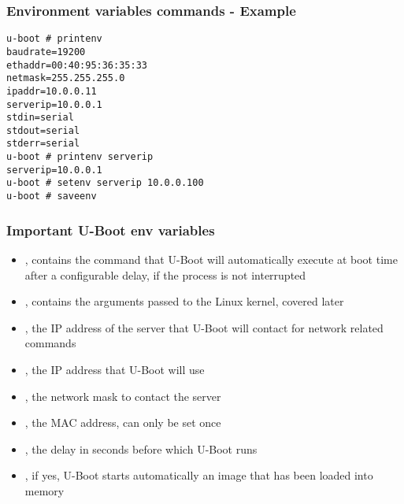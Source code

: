 \begin{frame}[fragile]
\frametitle{Environment variables commands - Example}
\begin{verbatim}
u-boot # printenv
baudrate=19200
ethaddr=00:40:95:36:35:33
netmask=255.255.255.0
ipaddr=10.0.0.11
serverip=10.0.0.1
stdin=serial
stdout=serial
stderr=serial
u-boot # printenv serverip
serverip=10.0.0.1
u-boot # setenv serverip 10.0.0.100
u-boot # saveenv
\end{verbatim}
\end{frame}

\begin{frame}
  \frametitle{Important U-Boot env variables}
  \begin{itemize}
  \item {}, contains the command that U-Boot will
    automatically execute at boot time after a configurable delay, if
    the process is not interrupted
  \item {}, contains the arguments passed to the Linux
    kernel, covered later
  \item {}, the IP address of the server that U-Boot will
    contact for network related commands
  \item {}, the IP address that U-Boot will use
  \item {}, the network mask to contact the server
  \item {}, the MAC address, can only be set once
  \item {}, the delay in seconds before which U-Boot
    runs 
  \item {}, if yes, U-Boot starts automatically an image
    that has been loaded into memory
  \end{itemize}
\end{frame}

